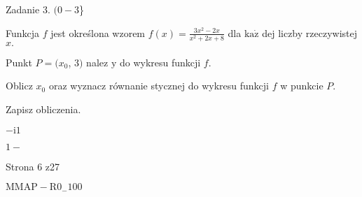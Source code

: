 \documentclass[a4paper,12pt]{article}
\begin{document}
Zadanie 3. $(0-3$\}

Funkcja $f$ jest określona wzorem $f(x)=\displaystyle \frac{3x^{2}-2x}{x^{2}+2x+8}$ dla $\mathrm{k}\mathrm{a}\dot{\mathrm{z}}$ dej liczby rzeczywistej $x.$

Punkt $P=(x_{0}$, 3$)$ nalez $\mathrm{y}$ do wykresu funkcji $f.$

Oblicz $x_{0}$ oraz wyznacz równanie stycznej do wykresu funkcji $f$ w punkcie $P.$

Zapisz obliczenia.

$-\mathrm{i}1$

$1 -$

Strona 6 z27

$\mathrm{M}\mathrm{M}\mathrm{A}\mathrm{P}-\mathrm{R}0_{-}100$
\end{document}
